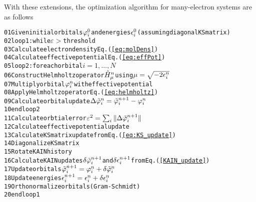 With these extensions, the optimization algorithm for many-electron systems 
are as follows 
\begin{alltt}
01 Given initial orbitals \(\varphi\sb{i}\sp{0}\) and energies \(\epsilon\sb{i}\sp{0}\) (assuming diagonal KS matrix)
02 loop1: while \(\varepsilon > \) threshold
03     Calculate electron density Eq.(\ref{eq:molDens})
04     Calculate effective potential Eq.(\ref{eq:effPot})
05     loop2: for each orbital \(i = 1,...,N\)
06         Construct Helmholtz operator \(\hat{H}\sp{n}\sb{\mu}\) using \(\mu = \sqrt{-2\epsilon\sb{i}\sp{n}}\)
07         Multiply orbital \(\varphi\sb{i}\sp{n}\) with effective potential
08         Apply Helmholtz operator Eq.(\ref{eq:helmholtz})
09         Calculate orbital update \(\Delta\tilde{\varphi}\sb{i}\sp{n} = \tilde{\varphi}\sb{i}\sp{n+1}-\varphi\sb{i}\sp{n}\)
10     end loop2
11     Calculate orbtial error \(\varepsilon\sp{2} = \sum\sb{i} \|\Delta\tilde{\varphi}\sb{i}\sp{n+1}\|\) 
12     Calculate effective potential update
13     Calculate KS matrix update from Eq.(\ref{eq:KS_update})
14     Diagonalize KS matrix
15     Rotate KAIN history
16     Calculate KAIN updates \(\delta\tilde{\varphi}\sb{i}\sp{n+1}\) and \(\delta{\epsilon}\sb{i}\sp{n+1}\) from Eq.(\ref{KAIN_update}) 
17     Update orbitals \(\tilde{\varphi}\sb{i}\sp{n+1} = \varphi\sb{i}\sp{n} + \delta\tilde{\varphi}\sb{i}\sp{n}\)
18     Update energies \(\epsilon\sb{i}\sp{n+1} = \epsilon\sb{i}\sp{n} + \delta{\epsilon}\sb{i}\sp{n}\)
19     Orthonormalize orbitals (Gram-Schmidt)
20 end loop1
\end{alltt}

\pagebreak

